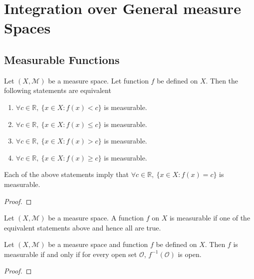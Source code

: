 
\section{Integration over General measure Spaces}
\subsection{Measurable Functions}

\begin{theorem}
	Let $(X,\mathcal{M})$ be a measure space.
	Let function $f$ be defined on $X$.
	Then the following statements are equivalent
	\begin{enumerate}
		\item $\forall c \in \mathbb{R},\ \{ x \in X : f(x) < c \}$ is measurable.
		\item $\forall c \in \mathbb{R},\ \{ x \in X : f(x) \le c \}$ is measurable.
		\item $\forall c \in \mathbb{R},\ \{ x \in X : f(x) > c \}$ is measurable.
		\item $\forall c \in \mathbb{R},\ \{ x \in X : f(x) \ge c \}$ is measurable.
	\end{enumerate}
	Each of the above statements imply that $\forall c \in \mathbb{R},\ \{ x \in X : f(x) = c \}$ is measurable.
\end{theorem}
\begin{proof}
\end{proof}

\begin{definition} 
	Let $(X,\mathcal{M})$ be a measure space.
	A function $f$ on $X$ is measurable if one of the equivalent statements above and  hence all are true.
\end{definition}

\begin{theorem}
	Let $(X,\mathcal{M})$ be a measure space and function $f$ be defined on $X$.
	Then $f$ is measurable if and only if for every open set $\mathcal{O}$, $f^{-1}(\mathcal{O})$ is open.
\end{theorem}
\begin{proof}
\end{proof}


